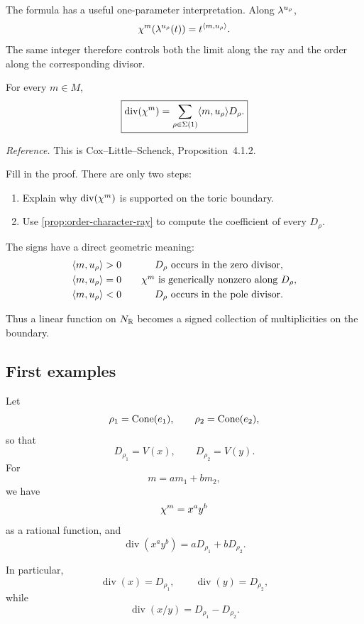 The formula has a useful one-parameter interpretation. Along
\(\lambda^{u_\rho}\),
\[
\chi^{m}(\lambda^{u_\rho}(t))
=
t^{\langle m,u_\rho\rangle}.
\]
The same integer therefore controls both the limit along the ray and
the order along the corresponding divisor.

\begin{theorem}
\label{thm:principal-divisor-character}
For every \(m\in M\),
\[
\boxed{
\operatorname{div}(\chi^{m})
=
\sum_{\rho\in\Sigma(1)}
\langle m,u_\rho\rangle D_\rho.
}
\]
\end{theorem}

\noindent
\textit{Reference.}
This is Cox--Little--Schenck, Proposition~4.1.2.

\begin{pauseandthink}
Fill in the proof. There are only two steps:
\begin{enumerate}[label=(\alph*),wide=0pt]
\item Explain why \(\operatorname{div}(\chi^{m})\) is supported
on the toric boundary.
\item Use \cref{prop:order-character-ray} to compute the coefficient
of every \(D_\rho\).
\end{enumerate}
\end{pauseandthink}

The signs have a direct geometric meaning:
\[
\begin{array}{c@{\qquad}c}
\langle m,u_\rho\rangle>0
&
D_\rho\text{ occurs in the zero divisor},
\\[1mm]
\langle m,u_\rho\rangle=0
&
\character{m}\text{ is generically nonzero along }D_\rho,
\\[1mm]
\langle m,u_\rho\rangle<0
&
D_\rho\text{ occurs in the pole divisor}.
\end{array}
\]

Thus a linear function on \(N_{\mathbb{R}}\) becomes a signed collection of
multiplicities on the boundary.

\subsection{First examples}

\begin{example}
Let
\[
\rho_1=\operatorname{Cone}(e_1),
\qquad
\rho_2=\operatorname{Cone}(e_2),
\]
so that
\[
D_{\rho_1}=V(x),
\qquad
D_{\rho_2}=V(y).
\]
For
\[
m=am_1+bm_2,
\]
we have
\[
\chi^{m}=x^ay^b
\]
as a rational function, and
\[
\operatorname{div}(x^ay^b)
=
aD_{\rho_1}+bD_{\rho_2}.
\]

In particular,
\[
\operatorname{div}(x)=D_{\rho_1},
\qquad
\operatorname{div}(y)=D_{\rho_2},
\]
while
\[
\operatorname{div}(x/y)
=
D_{\rho_1}-D_{\rho_2}.
\]
\end{example}

